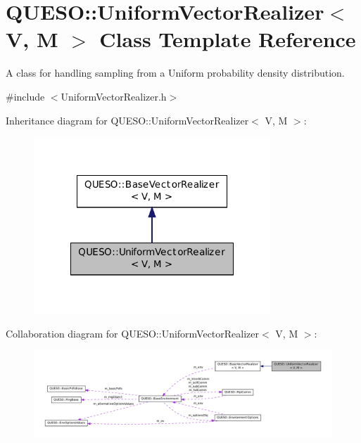 \hypertarget{class_q_u_e_s_o_1_1_uniform_vector_realizer}{\section{Q\-U\-E\-S\-O\-:\-:Uniform\-Vector\-Realizer$<$ V, M $>$ Class Template Reference}
\label{class_q_u_e_s_o_1_1_uniform_vector_realizer}
}


A class for handling sampling from a Uniform probability density distribution.  




{\ttfamily \#include $<$Uniform\-Vector\-Realizer.\-h$>$}



Inheritance diagram for Q\-U\-E\-S\-O\-:\-:Uniform\-Vector\-Realizer$<$ V, M $>$\-:
\nopagebreak
\begin{figure}[H]
\begin{center}
\leavevmode
\includegraphics[width=252pt]{class_q_u_e_s_o_1_1_uniform_vector_realizer__inherit__graph}
\end{center}
\end{figure}


Collaboration diagram for Q\-U\-E\-S\-O\-:\-:Uniform\-Vector\-Realizer$<$ V, M $>$\-:
\nopagebreak
\begin{figure}[H]
\begin{center}
\leavevmode
\includegraphics[width=350pt]{class_q_u_e_s_o_1_1_uniform_vector_realizer__coll__graph}
\end{center}
\end{figure}
